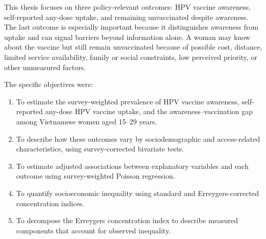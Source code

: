 This thesis focuses on three policy-relevant outcomes: HPV vaccine awareness, self-reported any-dose uptake, and remaining unvaccinated despite awareness. The last outcome is especially important because it distinguishes awareness from uptake and can signal barriers beyond information alone. A woman may know about the vaccine but still remain unvaccinated because of possible cost, distance, limited service availability, family or social constraints, low perceived priority, or other unmeasured factors.

The specific objectives were:
\begin{enumerate}
    \item To estimate the survey-weighted prevalence of HPV vaccine awareness, self-reported any-dose HPV vaccine uptake, and the awareness--vaccination gap among Vietnamese women aged 15--29 years.
    \item To describe how these outcomes vary by sociodemographic and access-related characteristics, using survey-corrected bivariate tests.
    \item To estimate adjusted associations between explanatory variables and each outcome using survey-weighted Poisson regression.
    \item To quantify socioeconomic inequality using standard and Erreygers-corrected concentration indices.
    \item To decompose the Erreygers concentration index to describe measured components that account for observed inequality.
\end{enumerate}

\clearpage
